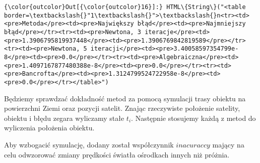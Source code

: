 \documentclass[11pt]{article}
\begin{document}
\begin{Verbatim}[commandchars=\\\{\}]
{\color{outcolor}Out[{\color{outcolor}16}]:} HTML\{String\}("<table border=\textbackslash{}"1\textbackslash{}">\textbackslash{}n<tr><td><pre>Metoda</pre><td><pre>Największy błąd</pre><td><pre>Najmniejszy błąd</pre></tr><tr><td><pre>Newtona, 3 iteracje</pre><td><pre>1.3906795819937448</pre><td><pre>1.3906769842819589</pre></tr><tr><td><pre>Newtona, 5 iteracji</pre><td><pre>3.40058597354799e-8</pre><td><pre>0.0</pre></tr><tr><td><pre>Algebraiczna</pre><td><pre>1.4097167877480388e-8</pre><td><pre>0.0</pre></tr><tr><td><pre>Bancrofta</pre><td><pre>1.3124799524722958e-8</pre><td><pre>0.0</pre></tr></table>")
\end{Verbatim}
            
    Będziemy sprawdzać dokładność metod za pomocą symulacji trasy obiektu na
powierzchni Ziemi oraz pozycji satelit. Znając rzeczywiste położenie
satelity, obiektu i błędu zegara wyliczamy stałe \(t_{i}\). Następnie
stosujemy każdą z metod do wyliczenia położenia obiektu.

Aby wzbogacić symulację, dodany został współczynnik \(inacuraccy\)
mający na celu odwzorować zmiany prędkości światła ośrodkach innych niż
próżnia.
\end{document}
